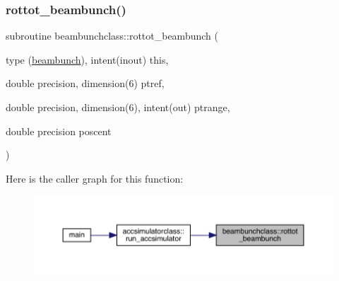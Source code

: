 \subsubsection{\texorpdfstring{rottot\_beambunch()}{rottot\_beambunch()}}
{\footnotesize\ttfamily subroutine beambunchclass\+::rottot\+\_\+beambunch (\begin{DoxyParamCaption}\item[{type (\mbox{\hyperlink{namespacebeambunchclass_structbeambunchclass_1_1beambunch}{beambunch}}), intent(inout)}]{this,  }\item[{double precision, dimension(6)}]{ptref,  }\item[{double precision, dimension(6), intent(out)}]{ptrange,  }\item[{double precision}]{poscent }\end{DoxyParamCaption})}

Here is the caller graph for this function\+:\nopagebreak
\begin{figure}[H]
\begin{center}
\leavevmode
\includegraphics[width=350pt]{namespacebeambunchclass_a6708b67cc6ed6cbdbba8340d6512ab4f_icgraph}
\end{center}
\end{figure}
\mbox{\label{namespacebeambunchclass_a950cb67b3fefb93f3d3a492fdef5b998}} 
